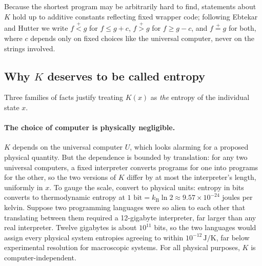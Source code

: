 \documentclass[10pt]{article}
\theoremstyle{definition}
\theoremstyle{remark}
\newcommand{\plt}{\mathrel{\stackrel{+}{<}}}
\newcommand{\pgt}{\mathrel{\stackrel{+}{>}}}
\newcommand{\peq}{\mathrel{\stackrel{+}{=}}}
\newcommand{\kB}{k_{\mathrm{B}}}
\begin{document}
Because the shortest program may be arbitrarily hard to find, statements about $K$ hold up to additive constants reflecting fixed wrapper code; following Ebtekar and Hutter we write $f \plt g$ for $f \le g + c$, $f \pgt g$ for $f \ge g - c$, and $f \peq g$ for both, where $c$ depends only on fixed choices like the universal computer, never on the strings involved.

\subsection{Why $K$ deserves to be called entropy}
\label{sec:Kjustified}

Three families of facts justify treating $K(x)$ as \emph{the} entropy of the individual state $x$.

\paragraph{The choice of computer is physically negligible.} $K$ depends on the universal computer $U$, which looks alarming for a proposed physical quantity. But the dependence is bounded by translation: for any two universal computers, a fixed interpreter converts programs for one into programs for the other, so the two versions of $K$ differ by at most the interpreter's length, uniformly in $x$. To gauge the scale, convert to physical units: entropy in bits converts to thermodynamic entropy at $1 \text{ bit} = \kB \ln 2 \approx 9.57 \times 10^{-24}$ joules per kelvin. Suppose two programming languages were so alien to each other that translating between them required a 12-gigabyte interpreter, far larger than any real interpreter. Twelve gigabytes is about $10^{11}$ bits, so the two languages would assign every physical system entropies agreeing to within $10^{-12}\,\mathrm{J/K}$, far below experimental resolution for macroscopic systems. For all physical purposes, $K$ is computer-independent.
\end{document}
